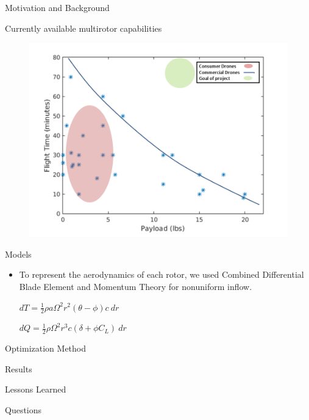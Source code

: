 \documentclass{beamer}
\begin{document}
\begin{frame}{Motivation and Background}
	\begin{center}
	Currently available multirotor capabilities
	\end{center}
	\begin{figure}
		\begin{center}
			\includegraphics[width=.70\textwidth]{current_rev.png}
			\label{current_capabilities}
		\end{center}
	\end{figure}
\end{frame}

\begin{frame}{Models}
	\begin{itemize}
		\item{To represent the aerodynamics of each rotor, we used Combined Differential Blade Element and Momentum Theory for nonuniform inflow.}
		\begin{center}
		$ dT = \frac{1}{2} \rho a \Omega^2 r^2 (\theta - \phi) c \  dr $
		
		$ dQ = \frac{1}{2} \rho \Omega^2 r^3 c (\delta + \phi C_L) \ dr $
		\end{center}
	\end{itemize}

\end{frame}

\begin{frame}{Optimization Method}

\end{frame}

\begin{frame}{Results}

\end{frame}

\begin{frame}{Lessons Learned}

\end{frame}

\begin{frame}{Questions}

\end{frame}
\end{document}
